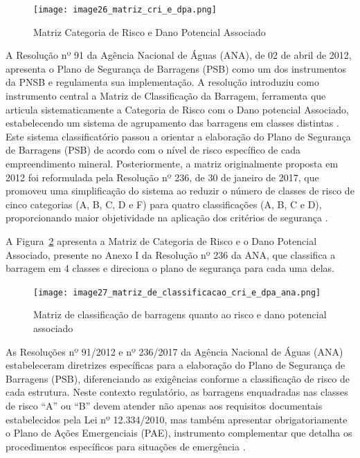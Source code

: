 \begin{figure}[htbp]
    \centering
    \texttt{[image: image26\_matriz\_cri\_e\_dpa.png]}
    \caption{Matriz Categoria de Risco e Dano Potencial Associado}
    \label{fig:matriz_cri_e_dpa}
\end{figure}

A Resolução nº 91 da Agência Nacional de Águas (ANA), de 02 de abril de 2012, apresenta o Plano de Segurança de Barragens (PSB) como um dos instrumentos da PNSB e regulamenta sua implementação. A resolução introduziu como instrumento central a Matriz de Classificação da Barragem, ferramenta que articula sistematicamente a Categoria de Risco com o Dano potencial Associado, estabelecendo um sistema de agrupamento das barragens em classes distintas \cite{carvalho2018, moecke2019}. Este sistema classificatório passou a orientar a elaboração do Plano de Segurança de Barragens (PSB) de acordo com o nível de risco específico de cada empreendimento mineral. Posteriormente, a matriz originalmente proposta em 2012 foi reformulada pela Resolução nº 236, de 30 de janeiro de 2017, que promoveu uma simplificação do sistema ao reduzir o número de classes de risco de cinco categorias (A, B, C, D e F) para quatro classificações (A, B, C e D), proporcionando maior objetividade na aplicação dos critérios de segurança \cite{carvalho2018, moecke2019}.

A Figura~\ref{fig:matriz_classificacao_ana} apresenta a Matriz de Categoria de Risco e o Dano Potencial Associado, presente no Anexo I da Resolução nº 236 da ANA, que classifica a barragem em 4 classes e direciona o plano de segurança para cada uma delas.

\begin{figure}[htbp]
    \centering
    \texttt{[image: image27\_matriz\_de\_classificacao\_cri\_e\_dpa\_ana.png]}
    \caption{Matriz de classificação de barragens quanto ao risco e dano potencial associado}
    \label{fig:matriz_classificacao_ana}
\end{figure}

As Resoluções nº 91/2012 e nº 236/2017 da Agência Nacional de Águas (ANA) estabeleceram diretrizes específicas para a elaboração do Plano de Segurança de Barragens (PSB), diferenciando as exigências conforme a classificação de risco de cada estrutura. Neste contexto regulatório, as barragens enquadradas nas classes de risco ``A'' ou ``B'' devem atender não apenas aos requisitos documentais estabelecidos pela Lei nº 12.334/2010, mas também apresentar obrigatoriamente o Plano de Ações Emergenciais (PAE), instrumento complementar que detalha os procedimentos específicos para situações de emergência \cite{moecke2019}.

